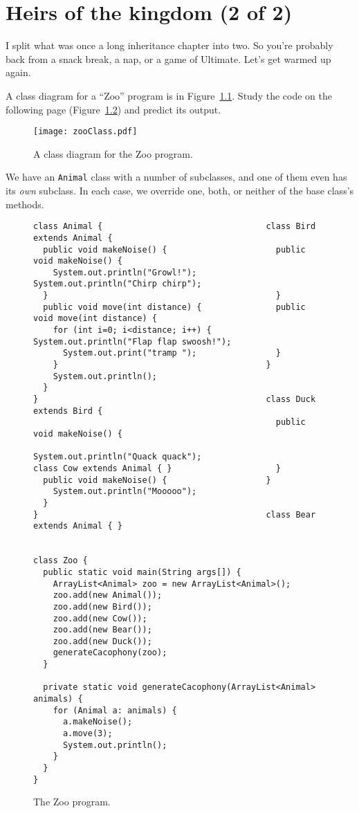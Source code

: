 
\chapter{Heirs of the kingdom (2 of 2)}

I split what was once a long inheritance chapter into two. So you're probably
back from a snack break, a nap, or a game of Ultimate. Let's get warmed up
again.

A class diagram for a ``Zoo'' program is in Figure~\ref{fig:zooClass}. Study
the code on the following page (Figure~\ref{fig:zooCode}) and predict its
output.

\begin{figure}[ht]
\centering
\texttt{[image: zooClass.pdf]}
\caption{A class diagram for the Zoo program.}
\label{fig:zooClass}
\end{figure}

We have an \texttt{Animal} class with a number of subclasses, and one of them
even has its \textit{own} subclass. In each case, we override one, both, or
neither of the base class's methods.

\begin{figure}
\begin{Verbatim}[fontsize=\scriptsize,samepage=true,frame=single]
class Animal {                                 class Bird extends Animal {
  public void makeNoise() {                      public void makeNoise() {
    System.out.println("Growl!");                  System.out.println("Chirp chirp");
  }                                              }
  public void move(int distance) {               public void move(int distance) {
    for (int i=0; i<distance; i++) {               System.out.println("Flap flap swoosh!");
      System.out.print("tramp ");                }
    }                                          }
    System.out.println();                      
  }
}                                              class Duck extends Bird {
                                                 public void makeNoise() {
                                                   System.out.println("Quack quack");
class Cow extends Animal { }                     }
  public void makeNoise() {                    }
    System.out.println("Mooooo");              
  }
}                                              class Bear extends Animal { }


class Zoo {
  public static void main(String args[]) {
    ArrayList<Animal> zoo = new ArrayList<Animal>();
    zoo.add(new Animal());
    zoo.add(new Bird());
    zoo.add(new Cow());
    zoo.add(new Bear());
    zoo.add(new Duck());
    generateCacophony(zoo);
  }

  private static void generateCacophony(ArrayList<Animal> animals) {
    for (Animal a: animals) {
      a.makeNoise();
      a.move(3);
      System.out.println();
    }
  }
}\end{Verbatim}
\caption{The Zoo program.}
\label{fig:zooCode}
\end{figure}

